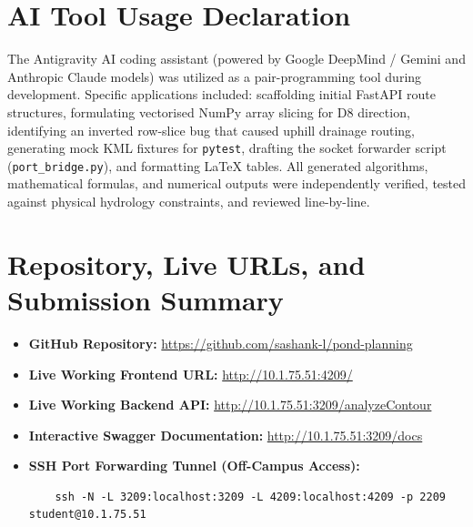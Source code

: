 \documentclass[manuscript,screen,review]{acmart}
\begin{document}
\section{AI Tool Usage Declaration}
\label{sec:ai-usage}

The Antigravity AI coding assistant (powered by Google DeepMind / Gemini and Anthropic Claude models)
was utilized as a pair-programming tool during development. Specific applications included:
scaffolding initial FastAPI route structures, formulating vectorised NumPy array slicing for D8 direction,
identifying an inverted row-slice bug that caused uphill drainage routing, generating mock KML fixtures
for \texttt{pytest}, drafting the socket forwarder script (\texttt{port\_bridge.py}), and formatting LaTeX tables.
All generated algorithms, mathematical formulas, and numerical outputs were independently verified,
tested against physical hydrology constraints, and reviewed line-by-line.

\appendix

\section{Repository, Live URLs, and Submission Summary}

\begin{itemize}
  \item \textbf{GitHub Repository:} \url{https://github.com/sashank-l/pond-planning}
  \item \textbf{Live Working Frontend URL:} \url{http://10.1.75.51:4209/}
  \item \textbf{Live Working Backend API:} \url{http://10.1.75.51:3209/analyzeContour}
  \item \textbf{Interactive Swagger Documentation:} \url{http://10.1.75.51:3209/docs}
  \item \textbf{SSH Port Forwarding Tunnel (Off-Campus Access):}
    \begin{verbatim}
    ssh -N -L 3209:localhost:3209 -L 4209:localhost:4209 -p 2209 student@10.1.75.51
    \end{verbatim}
\end{itemize}
\end{document}
